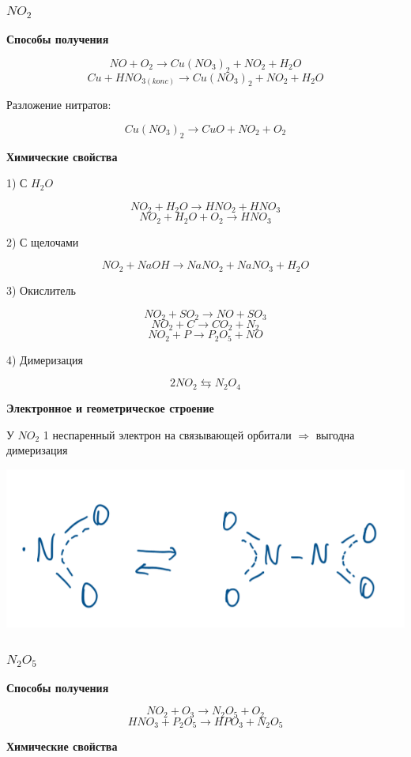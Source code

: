\documentclass[14pt,a4paper]{scrartcl}
\begin{document}
\subsubsection{$NO_2$}

\textbf{Способы получения}

$$NO + O_2 \rightarrow Cu(NO_3)_2 + NO_2 + H_2O$$
$$Cu + HNO_{3(konc)} \rightarrow Cu(NO_3)_2 + NO_2 + H_2O$$

Разложение нитратов:

$$Cu(NO_3)_2 \rightarrow CuO + NO_2 + O_2$$

\textbf{Химические свойства}

1) С $H_2O$

$$NO_2 + H_2O \rightarrow HNO_2 + HNO_3$$
$$NO_2 + H_2O + O_2 \rightarrow HNO_3$$

2) С щелочами

$$NO_2 + NaOH \rightarrow NaNO_2 + NaNO_3 + H_2O$$

3) Окислитель

$$NO_2 + SO_2 \rightarrow NO + SO_3$$
$$NO_2 + C \rightarrow CO_2 + N_2$$
$$NO_2 + P \rightarrow P_2O_5 + NO$$

4) Димеризация

$$2NO_2 \leftrightarrows N_2O_4$$

\textbf{Электронное и геометрическое строение}

У $NO_2$ 1 неспаренный электрон на связывающей орбитали $\Rightarrow$ выгодна димеризация

\includegraphics{8v10.png}

\subsubsection{$N_2O_5$}

\textbf{Способы получения}

$$NO_2 +O_3 \rightarrow N_2O_5 + O_2$$
$$HNO_3  + P_2O_5 \rightarrow HPO_3 + N_2O_5$$

\textbf{Химические свойства}
\end{document}

